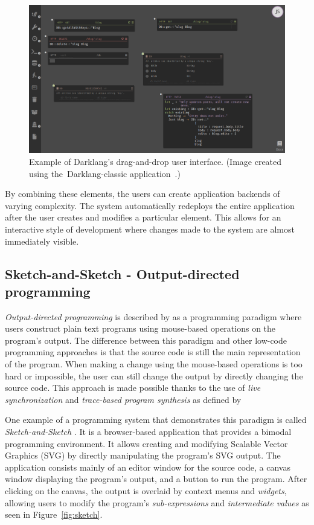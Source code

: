 \begin{figure}[htbp]
	\centering
	\includegraphics[width=1\linewidth]{img/darklang.pdf}
	\caption{Example of Darklang's drag-and-drop user interface. (Image created using the~Darklang-classic application~\cite{darklang}.)}
	\label{fig:darklang}
\end{figure}

By combining these elements, the users can create application backends of varying complexity.
The system automatically redeploys the entire application after the user creates and modifies a particular element.
This allows for an interactive style of development where changes made to the system are almost immediately visible.

\subsection{Sketch-and-Sketch - Output-directed programming}
\label{sec:odp}
\emph{Output-directed programming} is described by \citet{sketch-and-sketch} as
a programming paradigm where users construct plain text programs using mouse-based operations on the program's output.
The difference between this paradigm and other low-code programming approaches is that the source code is still the main representation of the program.
When making a change using the mouse-based operations is too hard or impossible, the user
can still change the output by directly changing the source code.
This approach is made possible thanks to the use of \emph{live synchronization} and \emph{trace-based program synthesis} as defined by \citet{output-directed-programming}

One example of a programming system that demonstrates this paradigm is called \emph{Sketch-and-Sketch} \cite{sketch-and-sketch,output-directed-programming}.
It is a browser-based application that provides a bimodal programming environment. It allows creating and modifying Scalable Vector Graphics (SVG) by directly manipulating the program's SVG output.
The application consists mainly of an editor window for the source code, a canvas window displaying the program's output, and a button to run the program.
After clicking on the canvas, the output is overlaid by context menus and \emph{widgets}, allowing users to modify the program's \emph{sub-expressions} and \emph{intermediate values} as seen in Figure~\ref{fig:sketch}.

